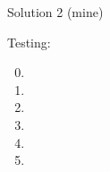 \begin{solution}{Solution 2 (mine)}
\begin{lcode}
\def\LastDigit#1#2{%
  \ifodd 0#21 \else #1\expandafter\@gobbletwo\fi\LastDigit #2}

\def\OrdinalDay#1{#1%
  \ifcase\LastDigit #1\space th\or st\or nd\or rd\else th\fi}

 
\noindent Testing:
\begin{enumerate}\setcounter{enumi}{-1}
\item \printdate
\item {} 
\item {}
\item {} 
\item {} 
\item {}
\end{enumerate}

\end{lcode}

\end{solution}


